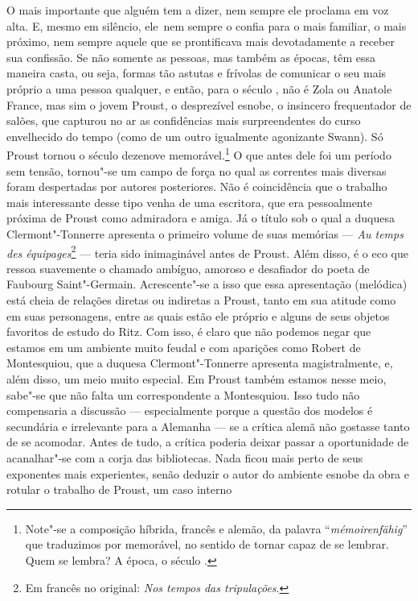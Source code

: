 O mais importante que alguém tem a dizer, nem sempre ele proclama em voz
alta. E, mesmo em silêncio, ele~nem sempre o confia para o mais
familiar, o mais próximo, nem sempre aquele que se prontificava mais
devotadamente a receber sua confissão. Se não somente as pessoas, mas
também as épocas, têm essa maneira casta, ou seja, formas tão astutas e
frívolas de comunicar o seu mais próprio a uma pessoa qualquer, e então,
para o século , não é Zola ou Anatole France, mas sim o jovem Proust,
o desprezível esnobe, o insincero frequentador de salões, que capturou
no ar as confidências mais surpreendentes do curso envelhecido do tempo
(como de um outro igualmente agonizante Swann). Só Proust tornou o
século dezenove memorável.\footnote{Note"-se a composição híbrida,
  francês e alemão, da palavra ``\emph{mémoirenfähig}'' que traduzimos
  por memorável, no sentido de tornar capaz de se lembrar. Quem se
  lembra? A época, o século . \versal{[N.~T.]}} O que antes dele foi um período sem
tensão, tornou"-se um campo de força no qual as correntes mais diversas
foram despertadas por autores posteriores. Não é coincidência que o
trabalho mais interessante desse tipo venha de uma escritora, que era
pessoalmente próxima de Proust como admiradora e amiga. Já o título sob
o qual a duquesa Clermont"-Tonnerre apresenta o primeiro volume de suas
memórias --- \emph{Au temps des équipages}\footnote{Em francês no original: \emph{Nos tempos das tripulações}. \versal{[N.~T.]}} --- teria sido inimaginável antes de
Proust. Além disso, é o eco que ressoa suavemente o chamado ambíguo,
amoroso e desafiador do poeta de Faubourg Saint"-Germain. Acrescente"-se a
isso que essa apresentação (melódica) está cheia de relações diretas ou
indiretas a Proust, tanto em sua atitude como em suas personagens, entre
as quais estão ele próprio e alguns de seus objetos favoritos de estudo
do Ritz. Com isso, é claro que não podemos negar que estamos em um
ambiente muito feudal e com aparições como Robert de Montesquiou, que a
duquesa Clermont"-Tonnerre apresenta magistralmente, e, além disso, um
meio muito especial. Em Proust também estamos nesse meio, sabe"-se que
não falta um correspondente a Montesquiou. Isso tudo não compensaria a
discussão --- especialmente porque a questão dos modelos é secundária e
irrelevante para a Alemanha --- se a crítica alemã não gostasse tanto de
se acomodar. Antes de tudo, a crítica poderia deixar passar a
oportunidade de acanalhar"-se com a corja das bibliotecas. Nada ficou
mais perto de seus exponentes mais experientes, senão deduzir o autor do
ambiente esnobe da obra e rotular o trabalho de Proust, um caso interno
